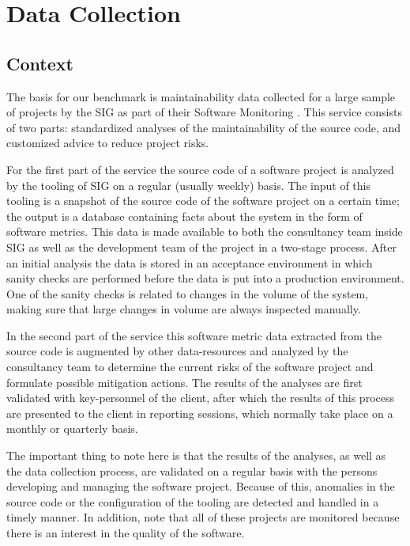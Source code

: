 \section{Data Collection}
\label{sec:DataCollection}

\subsection{Context}

The basis for our benchmark is maintainability data collected for a large sample of projects by the SIG as part of their Software Monitoring \cite{kuipers2004portfoliomonitoring}.
This service consists of two parts: standardized analyses of the maintainability of the source code, and customized advice to reduce project risks.

For the first part of the service the source code of a software project is analyzed by the tooling of SIG on a regular (usually weekly) basis.
The input of this tooling is a snapshot of the source code of the software project on a certain time; the output is a database containing facts about the system in the form of software metrics.
This data is made available to both the consultancy team inside SIG as well as the development team of the project in a two-stage process.
After an initial analysis the data is stored in an acceptance environment in which sanity checks are performed before the data is put into a production environment.
One of the sanity checks is related to changes in the volume of the system, making sure that large changes in volume are always inspected manually. 

In the second part of the service this software metric data extracted from the source code is augmented by other data-resources and analyzed by the consultancy team to determine the current risks of the software project and formulate possible mitigation actions.
The results of the analyses are first validated with key-personnel of the client, after which the results of this process are presented to the client in reporting sessions, which normally take place on a monthly or quarterly basis. 

The important thing to note here is that the results of the analyses, as well as the data collection process, are validated on a regular basis with the persons developing and managing the software project.
Because of this, anomalies in the source code or the configuration of the tooling are detected and handled in a timely manner.
In addition, note that all of these projects are monitored because there is an interest in the quality of the software.

